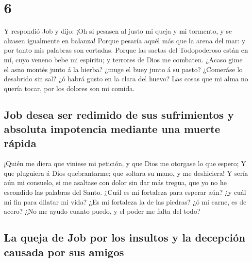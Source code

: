 \hypertarget{section-18-6}{%
\section{6}\label{section-18-6}}

 Y respondió Job y dijo:  ¡Oh si pesasen al
justo mi queja y mi tormento, y se alzasen igualmente en balanza!
 Porque pesaría aquél más que la arena del mar: y por
tanto mis palabras son cortadas.  Porque las saetas del
Todopoderoso están en mí, cuyo veneno bebe mi espíritu; y terrores de
Dios me combaten.  ¿Acaso gime el asno montés junto á la
hierba? ¿muge el buey junto á su pasto?  ¿Comeráse lo
desabrido sin sal? ¿ó habrá gusto en la clara del huevo? 
Las cosas que mi alma no quería tocar, por los dolores son mi comida.

\hypertarget{job-desea-ser-redimido-de-sus-sufrimientos-y-absoluta-impotencia-mediante-una-muerte-ruxe1pida}{%
\subsection{Job desea ser redimido de sus sufrimientos y absoluta
impotencia mediante una muerte
rápida}\label{job-desea-ser-redimido-de-sus-sufrimientos-y-absoluta-impotencia-mediante-una-muerte-ruxe1pida}}

 ¡Quién me diera que viniese mi petición, y que Dios me
otorgase lo que espero;  Y que pluguiera á Dios
quebrantarme; que soltara su mano, y me deshiciera!  Y
sería aún mi consuelo, si me asaltase con dolor sin dar más tregua, que
yo no he escondido las palabras del Santo.  ¿Cuál es mi
fortaleza para esperar aún? ¿y cuál mi fin para dilatar mi vida?
 ¿Es mi fortaleza la de las piedras? ¿ó mi carne, es de
acero?  ¿No me ayudo cuanto puedo, y el poder me falta
del todo?

\hypertarget{la-queja-de-job-por-los-insultos-y-la-decepciuxf3n-causada-por-sus-amigos}{%
\subsection{La queja de Job por los insultos y la decepción causada por
sus
amigos}\label{la-queja-de-job-por-los-insultos-y-la-decepciuxf3n-causada-por-sus-amigos}}

